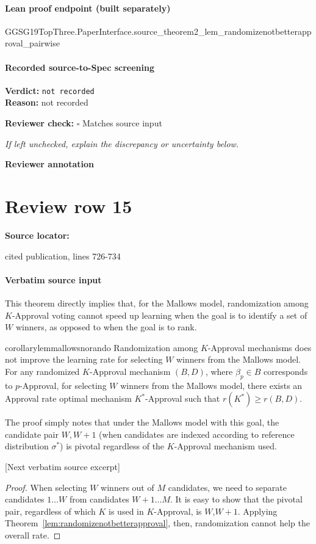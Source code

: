 \documentclass[10pt]{article}
\newcommand{\reviewerbox}{%
  \par\noindent\fbox{\parbox{0.96\linewidth}{\rule{0pt}{0.38in}}}\par
}
\newcommand{\reviewmatch}[1]{%
  \par\noindent\textbf{Reviewer check:} $\square$\; #1\par
  \noindent\emph{If left unchecked, explain the discrepancy or uncertainty below.}\par
}
\begin{document}
\paragraph{Lean proof endpoint (built separately)}\begin{ReviewVerbatim}
GGSG19TopThree.PaperInterface.source_theorem2_lem_randomizenotbetterapproval_pairwise
\end{ReviewVerbatim}

\paragraph{Recorded source-to-Spec screening}
\textbf{Verdict:} \texttt{not recorded}
\\
\textbf{Reason:} not recorded
\reviewmatch{Matches source input}
\noindent\textbf{Reviewer annotation}\par
\reviewerbox
\clearpage
\hypertarget{source-claim-c1058349a9163721}{}
\section*{Review row 15}
\textbf{Source locator:} {\footnotesize\raggedright cited publication, lines 726-\allowbreak{}734\par}
\paragraph{Verbatim source input}
\begin{ReviewVerbatim}
This theorem directly implies that, for the Mallows model, randomization among $K$-Approval voting cannot speed up learning when the goal is to identify a set of $W$ winners, as opposed to when the goal is to rank.

\begin{restatable}{corollary}{lemmallowsnorando}
	\label{lem:mallowsnorando}
			Randomization among $K$-Approval mechanisms does not improve the learning rate for selecting $W$ winners from the Mallows model. For any randomized $K$-Approval mechanism $(B,D)$, where $\beta_p\in B$ corresponds to $p$-Approval, for selecting $W$ winners from the Mallows model, there exists an Approval rate optimal mechanism $K^*$-Approval such that $r(K^*) \geq r(B,D)$.

\end{restatable}

The proof simply notes that under the Mallows model with this goal, the candidate pair $W, W+1$ (when candidates are indexed according to reference distribution $\sigma^*$) is pivotal regardless of the $K$-Approval mechanism used.

[Next verbatim source excerpt]

\lemmallowsnorando*
\begin{proof}
	When selecting $W$ winners out of $M$ candidates, we need to separate candidates $1 \dots W$ from candidates $W + 1 \dots M$. It is easy to show that the pivotal pair, regardless of which $K$ is used in $K$-Approval, is $W$,$W+1$. Applying Theorem~\ref{lem:randomizenotbetterapproval}, then, randomization cannot help the overall rate.
\end{proof}
\end{ReviewVerbatim}
\end{document}
